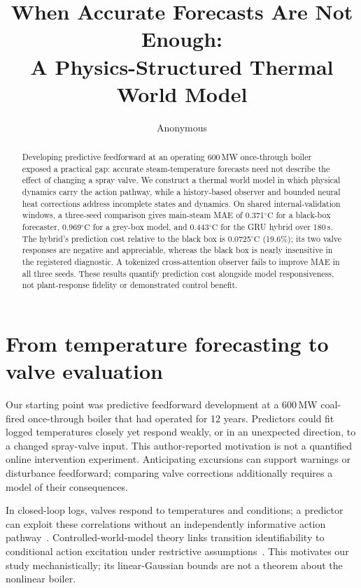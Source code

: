 \documentclass{article}
\title{When Accurate Forecasts Are Not Enough:\\A Physics-Structured Thermal World Model}
\author{Anonymous}
\newcommand{\degc}{\ensuremath{^{\circ}\mathrm{C}}}
\begin{document}
\maketitle

\begin{abstract}
Developing predictive feedforward at an operating 600\,MW once-through boiler
exposed a practical gap: accurate steam-temperature forecasts need not describe
the effect of changing a spray valve. We construct a thermal world model in
which physical dynamics carry the action pathway, while a history-based observer
and bounded neural heat corrections address incomplete states and dynamics.
On shared internal-validation windows, a three-seed comparison gives main-steam
MAE of 0.371\degc{} for a black-box forecaster, 0.969\degc{} for a grey-box model,
and 0.443\degc{} for the GRU hybrid over 180\,s. The hybrid's prediction cost
relative to the black box is 0.0725\degc{} (19.6\%); its two valve responses are
negative and appreciable, whereas the black box is nearly insensitive in the
registered diagnostic. A tokenized cross-attention observer fails to improve
MAE in all three seeds. These results quantify prediction cost alongside model
responsiveness, not plant-response fidelity or demonstrated control benefit.
\end{abstract}

\section{From temperature forecasting to valve evaluation}

Our starting point was predictive feedforward development at a 600\,MW coal-fired
once-through boiler that had operated for 12 years. Predictors could fit logged
temperatures closely yet respond weakly, or in an unexpected direction, to a
changed spray-valve input. This author-reported motivation is not a quantified
online intervention experiment. Anticipating excursions can support warnings
or disturbance feedforward; comparing valve corrections additionally requires
a model of their consequences.

In closed-loop logs, valves respond to temperatures and conditions; a predictor
can exploit these correlations without an independently informative action
pathway~\cite{forssell1999closedloop}. Controlled-world-model theory links
transition identifiability to conditional action excitation under restrictive
assumptions~\cite{zhang2026identifiability}. This motivates our study mechanistically;
its linear-Gaussian bounds are not a theorem about the nonlinear boiler.
\end{document}
